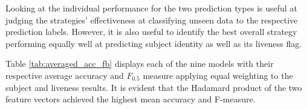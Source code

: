 \documentclass{mpaper}
\begin{document}
Looking at the individual performance for the two prediction types is useful at judging the strategies' effectiveness at classifying unseen data to the respective prediction labels. However, it is also useful to identify the best overall strategy performing equally well at predicting subject identity as well as its liveness flag.

Table \ref{tab:averaged_acc_fb} displays each of the nine models with their respective average accuracy and $F_{0.5}$ measure applying equal weighting to the subject and liveness results. It is evident that the Hadamard product of the two feature vectors achieved the highest mean accuracy and F-measure.

\begin{table}[htbp]
    \centering
    \vspace{0.1cm}
    \caption{Averaged accuracy and $F_{0.5}$ score for the seven fusion strategies and individual modalities, applying equal weighting to subject and liveness predictions.}
    \label{tab:averaged_acc_fb}
    \vspace{-0.3cm}
\end{table}
\end{document}
